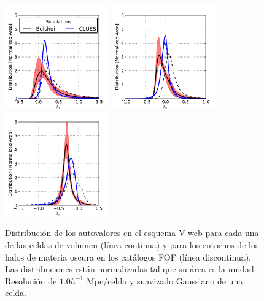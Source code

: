 \begin{figure}[htbp]
	\centering
	\includegraphics[width=0.4\textwidth]
	{./figures/4_results/Cells_Distro_L1.pdf}
	\includegraphics[width=0.4\textwidth]
	{./figures/4_results/Cells_Distro_L2.pdf}
	\includegraphics[width=0.4\textwidth]
	{./figures/4_results/Cells_Distro_L3.pdf}

	\caption{\small{ Distribución de los autovalores en el esquema V-web
	para cada una de las celdas de volumen (línea continua) y para los 
	entornos de los halos de materia oscura en los catálogos FOF (línea 
	discontinua). Las distribuciones están normalizadas tal que su área es
	la unidad. Resolución de $1.0 h^{-1}$ Mpc/celda y suavizado Gaussiano
	de una celda.}}
	\label{fig:1D_Cells_Eigenvalues}
\end{figure}



